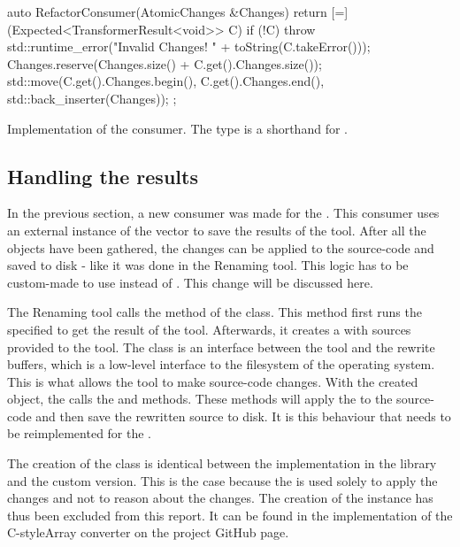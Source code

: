 \begin{listing}[H]
    \begin{cppcode}
auto RefactorConsumer(AtomicChanges &Changes) {
        return [=](Expected<TransformerResult<void>> C) {
            if (!C) {
                throw std::runtime_error("Invalid Changes! " + toString(C.takeError()));
            }
            Changes.reserve(Changes.size() + C.get().Changes.size());
            std::move(C.get().Changes.begin(), C.get().Changes.end(), std::back_inserter(Changes));
        };
}
    \end{cppcode}
    \caption{Implementation of the  consumer. The  type is a shorthand for .}
    \label{code:085tool_ex:030cstyle:consumer_impl}
\end{listing}

\subsection{Handling the results}

In the previous section, a new consumer was made for the . This consumer uses an external instance of the vector to save the results of the tool. After all the  objects have been gathered, the changes can be applied to the source-code and saved to disk - like it was done in the Renaming tool. This logic has to be custom-made to use  instead of . This change will be discussed here.

The Renaming tool calls the  method of the  class. This method first runs the specified  to get the result of the tool. Afterwards, it creates a  with sources provided to the tool. The  class is an interface between the tool and the rewrite buffers, which is a low-level interface to the filesystem of the operating system.
This  is what allows the tool to make source-code changes. With the created  object, the  calls the  and  methods. These methods will apply the  to the source-code and then save the rewritten source to disk. It is this behaviour that needs to be reimplemented for the .

The creation of the  class is identical between the implementation in the library and the custom version. This is the case because the  is used solely to apply the changes and not to reason about the changes. The creation of the  instance has thus been excluded from this report. It can be found in the implementation of the C-styleArray converter on the project GitHub page. 

